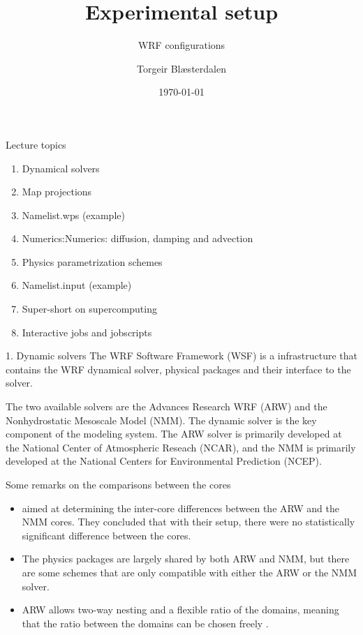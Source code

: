 \documentclass{beamer}
\title{Experimental setup}
\subtitle{WRF configurations}
\author{Torgeir Blæsterdalen}
\institute{Department of Industrial Engineering, UiT-The Arctic University of Norway}
\date{\today}
\begin{document}
\begin{frame}
\titlepage
\end{frame}


\begin{frame}{Lecture topics}
\begin{enumerate}
	\item Dynamical solvers
	\item Map projections
	\item Namelist.wps (example)
	\item Numerics:Numerics: diffusion, damping and advection
	\item Physics parametrization schemes
	\item Namelist.input (example)
	\item Super-short on supercomputing
	\item Interactive jobs and jobscripts
\end{enumerate}
\end{frame}


\begin{frame}[fragile, allowframebreaks=1, t]{1. Dynamic solvers}
The WRF Software Framework (WSF) is a infrastructure that contains the WRF dynamical solver, physical packages and their interface to the solver.

The two available solvers are the Advances Research WRF (ARW) and the Nonhydrostatic Mesoscale Model (NMM). 
The dynamic solver is the key component of the modeling system. The ARW solver is primarily developed at the National Center of Atmospheric Reseach (NCAR), and the NMM is primarily developed at the National Centers for Environmental Prediction (NCEP). 

Some remarks on the comparisons between the cores
\begin{itemize}
	\item \citet{bernardetcomparison} aimed at determining the inter-core differences between the ARW and the NMM cores. They concluded that with their setup, there were no statistically significant difference between the cores. 
	\item The physics packages are largely shared by both ARW and NMM, but there are some schemes that are only compatible with either the ARW or the NMM solver.
	\item ARW allows two-way nesting and a flexible ratio of the domains, meaning that the ratio between the domains can be chosen freely \citep{skamarock2008description}.
\end{itemize}


\end{frame}
\end{document}
